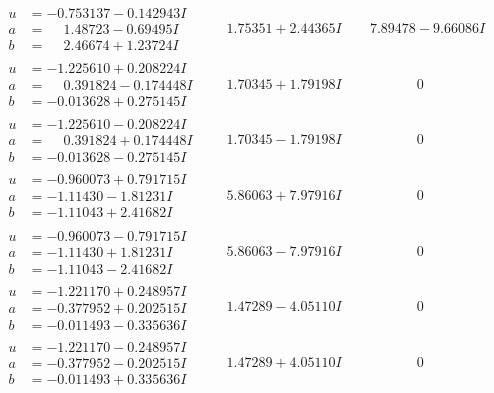 \documentclass[1p]{elsarticle_modified}
\theoremstyle{definition}
\begin{document}
$$\begin{array}{c|c|c}
\begin{aligned}
u &= -0.753137 - 0.142943 I \\
a &= \phantom{-}1.48723 - 0.69495 I \\
b &= \phantom{-}2.46674 + 1.23724 I\end{aligned}
 & \phantom{-}1.75351 + 2.44365 I & \phantom{-}7.89478 - 9.66086 I \\ \hline\begin{aligned}
u &= -1.225610 + 0.208224 I \\
a &= \phantom{-}0.391824 - 0.174448 I \\
b &= -0.013628 + 0.275145 I\end{aligned}
 & \phantom{-}1.70345 + 1.79198 I & \phantom{-0.000000 } 0 \\ \hline\begin{aligned}
u &= -1.225610 - 0.208224 I \\
a &= \phantom{-}0.391824 + 0.174448 I \\
b &= -0.013628 - 0.275145 I\end{aligned}
 & \phantom{-}1.70345 - 1.79198 I & \phantom{-0.000000 } 0 \\ \hline\begin{aligned}
u &= -0.960073 + 0.791715 I \\
a &= -1.11430 - 1.81231 I \\
b &= -1.11043 + 2.41682 I\end{aligned}
 & \phantom{-}5.86063 + 7.97916 I & \phantom{-0.000000 } 0 \\ \hline\begin{aligned}
u &= -0.960073 - 0.791715 I \\
a &= -1.11430 + 1.81231 I \\
b &= -1.11043 - 2.41682 I\end{aligned}
 & \phantom{-}5.86063 - 7.97916 I & \phantom{-0.000000 } 0 \\ \hline\begin{aligned}
u &= -1.221170 + 0.248957 I \\
a &= -0.377952 + 0.202515 I \\
b &= -0.011493 - 0.335636 I\end{aligned}
 & \phantom{-}1.47289 - 4.05110 I & \phantom{-0.000000 } 0 \\ \hline\begin{aligned}
u &= -1.221170 - 0.248957 I \\
a &= -0.377952 - 0.202515 I \\
b &= -0.011493 + 0.335636 I\end{aligned}
 & \phantom{-}1.47289 + 4.05110 I & \phantom{-0.000000 } 0 \\ \hline\begin{aligned}

\end{aligned}
\end{array}$$
\end{document}
